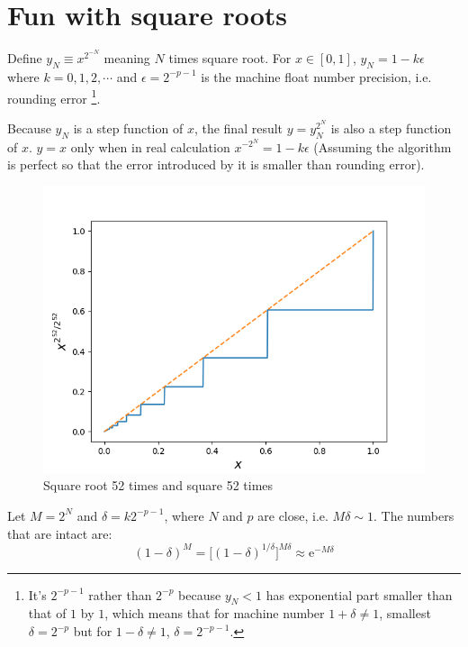 \documentclass[11pt]{article}
\numberwithin{equation}{section} %
\newcommand\e{\mathrm{e}}
\begin{document}
\section{Fun with square roots}
Define $y_N\equiv x^{2^{-N}}$ meaning $N$ times square root. For $x\in [0,
1]$, $y_N = 1-k\epsilon$ where $k=0,1,2,\cdots$ and $\epsilon = 2^{-p-1}$
is the machine float number precision, i.e. rounding error
\footnote{It's $2^{-p-1}$ rather than $2^{-p}$ because $y_N < 1$ has
exponential part smaller than that of $1$ by $1$, which means that for 
machine number $1+\delta\neq 1$, smallest $\delta = 2^{-p}$ but for $1-\delta
\neq 1$, $\delta = 2^{-p-1}$. }.

Because $y_N$ is a step function of $x$, the final result $y = y_N^{2^N}$ 
is also a step function of $x$. $y=x$ only when in real calculation 
$x^{-2^{N}} = 1-k\epsilon$
(Assuming the algorithm is perfect so that the error introduced by it is
smaller than rounding error). 
\begin{figure}[!htp]
  \centering
  \includegraphics[width=0.8\linewidth]{p6.png}
  \caption{Square root 52 times and square 52 times}
\end{figure}

Let $M = 2^N$ and $\delta = k2^{-p-1}$, where $N$ and $p$ are close, i.e. 
$M\delta\sim 1$. The numbers that are intact are: 
\newcommand\off{{n_{\text{off}}}}
\begin{equation}
  (1-\delta)^M = \big[(1-\delta)^{1/\delta}\big]^{M\delta} \approx \e^{-M\delta}
\end{equation}
\end{document}
